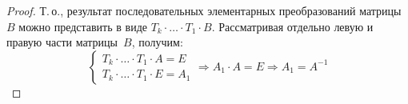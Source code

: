 \begin{proof}
Т.\,о., результат последовательных элементарных преобразований матрицы~$B$ можно представить в виде $T_k \cdot \ldots \cdot T_1 \cdot B$.
Рассматривая отдельно левую и правую части матрицы~$B$, получим:
\begin{equation*}
\begin{cases}
T_k \cdot \ldots \cdot T_1 \cdot A = E \\
T_k \cdot \ldots \cdot T_1 \cdot E = A_1
\end{cases}
\Rightarrow A_1 \cdot A = E \Rightarrow A_1 = A^{-1}
\end{equation*}
\end{proof}